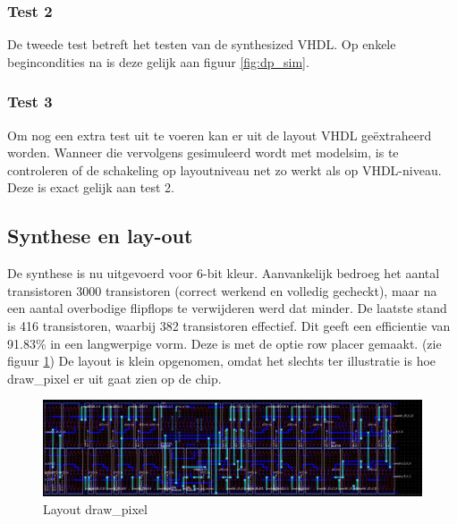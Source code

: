 \documentclass{scrartcl} %
\begin{document}
\subsubsection{Test 2}
De tweede test betreft het testen van de synthesized VHDL. Op enkele begincondities na is deze gelijk aan  figuur \ref{fig:dp_sim}. 

\subsubsection{Test 3}
Om nog een extra test uit te voeren kan er uit de layout VHDL geëxtraheerd worden. Wanneer die vervolgens gesimuleerd wordt met modelsim, is te controleren of de schakeling op layoutniveau net zo werkt als op VHDL-niveau. Deze is exact gelijk aan test 2. 
\subsection{Synthese en lay-out}
De synthese is nu uitgevoerd voor 6-bit kleur. Aanvankelijk bedroeg het aantal transistoren 3000 transistoren (correct werkend en volledig gecheckt), maar na een aantal overbodige flipflops te verwijderen werd dat minder. De laatste stand is 416 transistoren, waarbij 382 transistoren effectief. Dit geeft een efficientie van 91.83\% in een langwerpige vorm. Deze is met de optie row placer gemaakt. (zie figuur \ref{fig:dp_layout}) De layout is klein opgenomen, omdat het slechts ter illustratie is hoe draw\_pixel er uit gaat zien op de chip. 
\begin{figure} [h!]
\centering
\includegraphics [scale = 0.135] {resource/dp_layout-rc.jpg}
\caption{Layout draw\_pixel}
\label{fig:dp_layout}
\end{figure}

\newpage
\end{document}
